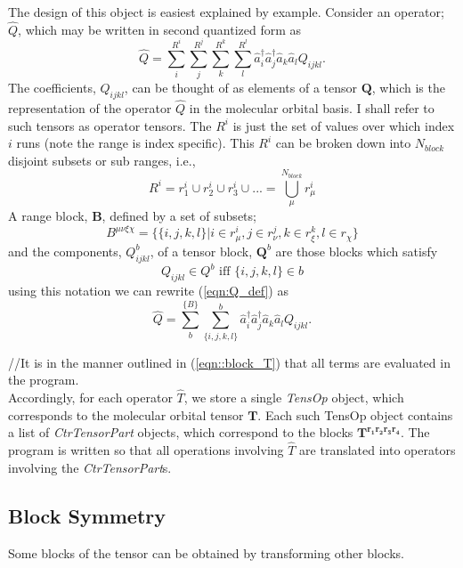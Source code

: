\documentclass[12pt]{article}
\begin{document}
\noindent The design of this object is easiest explained by example. Consider an operator; $\hat{Q}$,
which may be written in second quantized form as
\begin{equation}
\hat{Q} =  \sum_{i}^{R^{i}}\sum_{j}^{R^{j}}\sum_{k}^{R^{k}}\sum_{l}^{R^{l}} \hat{a}^{\dagger}_{i} \hat{a}^{\dagger}_{j} \hat{a}_{k} \hat{a}_{l} Q_{ijkl}.
\label{eqn:Q_def}
\end{equation}
\noindent  The coefficients,
$Q_{ijkl}$, can be thought of as elements of a tensor $\mathbf{Q}$, which is
the representation of the operator $\hat{Q}$ in the molecular orbital basis.
I shall refer to such tensors as operator tensors. The $R^{i}$ is just the set
of values over which index $i$ runs (note the range is index specific). This
$R^{i}$ can be broken down into $N_{block}$ disjoint subsets or sub ranges, i.e.,
\begin{equation}
R^{i} = r_{1}^{i} \cup r_{2}^{i} \cup r_{3}^{i} \cup ... = \bigcup^{N_{block}}_{\mu} r_{\mu}^{i}
\end{equation}
\noindent A range block, $\mathbf{B}$, defined by a set of subsets;
\begin{equation}
B^{\mu\nu\xi\chi} =  \{ \{i,j,k,l\} | i \in r_{\mu}^{i} , j \in r_{\nu}^{j},  k \in r_{\xi}^{k}, l\in r_{\chi} \}
\end{equation}
and the components, $ Q_{ijkl}^{b}$, of a tensor block, $\mathbf{Q}^{b}$ are those blocks which satisfy
\begin{equation}
Q_{ijkl} \in Q^{b} \text{ \ \ iff \ \ }  \{ i, j, k, l \} \in b   
\end{equation}
using this notation we can rewrite (\ref{eqn:Q_def}) as 
\begin{equation}
\hat{Q} =  \sum_{b}^{\{B\}} \sum_{\{i,j,k,l\}}^{b }
\hat{a}^{\dagger}_{i} \hat{a}^{\dagger}_{j} \hat{a}_{k} \hat{a}_{l} Q_{ijkl}.
\label{eqn:Q_block_def}
\end{equation}
\noindent 

//It is in the manner outlined in (\ref{eqn::block_T}) that all terms are evaluated in the program.\\

\noindent Accordingly, for each operator $\hat{T}$, we store a single \emph{TensOp} object, which corresponds
to the molecular orbital tensor $\mathbf{T}$.  Each such TensOp object contains a list of \emph{CtrTensorPart}
objects, which correspond to the blocks $\mathbf{T^{r_{1}r_{2}r_{3}r_{4}}}$. The program is
written so that all operations involving $\hat{T}$ are translated into operators involving the \emph{CtrTensorPart}s.

\subsection { Block Symmetry }

Some blocks of the tensor can be obtained by transforming other blocks.
\end{document}
